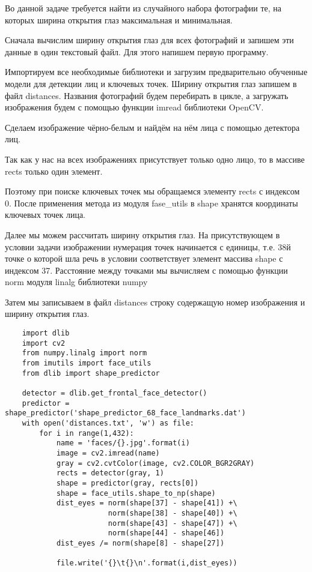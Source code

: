 \solutionSection

Во данной задаче требуется найти из случайного набора фотографии те, на которых ширина открытия глаз максимальная и минимальная.

Сначала вычислим ширину открытия глаз для всех фотографий и запишем эти данные в один текстовый файл. Для этого напишем первую программу.

Импортируем все необходимые библиотеки и загрузим предварительно обученные модели для детекции лиц и ключевых точек. Ширину открытия глаз запишем в файл distances. Названия фотографий будем перебирать в цикле, а загружать изображения будем с помощью функции imread библиотеки OpenCV.

Сделаем изображение чёрно-белым и найдём на нём лица с помощью детектора лиц.

Так как у нас на всех изображениях присутствует только одно лицо, то в массиве rects только один элемент.

Поэтому при поиске ключевых точек мы обращаемся элементу rects с индексом 0. После применения метода из модуля fase\_utils в shape хранятся координаты ключевых точек лица.

Далее мы можем рассчитать ширину открытия глаз. На присутствующем в условии задачи изображении нумерация точек начинается с единицы, т.е. 38й точке о которой шла речь в условии соответствует элемент массива shape с индексом 37. Расстояние между точками мы вычисляем с помощью функции norm модуля linalg библиотеки numpy

Затем мы записываем в файл distances строку содержащую номер изображения и ширину открытия глаз.

\begin{verbatim}
    import dlib
    import cv2
    from numpy.linalg import norm
    from imutils import face_utils
    from dlib import shape_predictor

    detector = dlib.get_frontal_face_detector()
    predictor = shape_predictor('shape_predictor_68_face_landmarks.dat')
    with open('distances.txt', 'w') as file:
        for i in range(1,432):
            name = 'faces/{}.jpg'.format(i)
            image = cv2.imread(name)
            gray = cv2.cvtColor(image, cv2.COLOR_BGR2GRAY)
            rects = detector(gray, 1)
            shape = predictor(gray, rects[0])
            shape = face_utils.shape_to_np(shape)
            dist_eyes = norm(shape[37] - shape[41]) +\
                        norm(shape[38] - shape[40]) +\
                        norm(shape[43] - shape[47]) +\
                        norm(shape[44] - shape[46])
            dist_eyes /= norm(shape[8] - shape[27])

            file.write('{}\t{}\n'.format(i,dist_eyes))
\end{verbatim}

